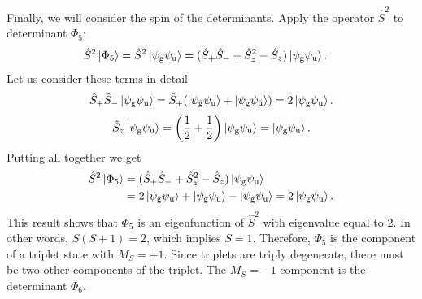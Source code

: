 \documentclass[../Main/chem532-notes.tex]{subfiles}
\begin{document}
Finally, we will consider the spin of the determinants.
Apply the operator $\hat{S}^2$ to determinant $\Phi_5$:
\begin{equation}
\begin{split}
\hat{S}^2 \ket{\Phi_5} &= \hat{S}^2  \ket{\psi_{\mathrm{g}} \psi_{\mathrm{u}}} 
= (\hat{S}_{+} \hat{S}_{-}  + \hat{S}_{z}^2 - \hat{S}_{z}) \ket{\psi_{\mathrm{g}} \psi_{\mathrm{u}}}.
\end{split}
\end{equation}
Let us consider these terms in detail
\begin{equation}
\hat{S}_{+} \hat{S}_{-} \ket{\psi_{\mathrm{g}} \psi_{\mathrm{u}}}
= \hat{S}_{+} (\ket{\psi_{\bar{\mathrm{g}}} \psi_{\mathrm{u}}} + \ket{\psi_{\mathrm{g}} \psi_{\bar{\mathrm{u}}}}
)
= 2 \ket{\psi_{\mathrm{g}} \psi_{\mathrm{u}}}.
\end{equation}
\begin{equation}
\hat{S}_{z} \ket{\psi_{\mathrm{g}} \psi_{\mathrm{u}}} = \left(\frac{1}{2} + \frac{1}{2}\right) \ket{\psi_{\mathrm{g}} \psi_{\mathrm{u}}} = \ket{\psi_{\mathrm{g}} \psi_{\mathrm{u}}}.
\end{equation}
Putting all together we get
\begin{equation}
\begin{split}
\hat{S}^2 \ket{\Phi_5} &= (\hat{S}_{+} \hat{S}_{-}  + \hat{S}_{z}^2 - \hat{S}_{z}) \ket{\psi_{\mathrm{g}} \psi_{\mathrm{u}}} \\
&= 2 \ket{\psi_{\mathrm{g}} \psi_{\mathrm{u}}} + \ket{\psi_{\mathrm{g}} \psi_{\mathrm{u}}} - \ket{\psi_{\mathrm{g}} \psi_{\mathrm{u}}} = 2 \ket{\psi_{\mathrm{g}} \psi_{\mathrm{u}}}.
\end{split}
\end{equation}
This result shows that $\Phi_5$ is an eigenfunction of $\hat{S}^2$ with eigenvalue equal to 2.
In other words, $S (S + 1) = 2$, which implies $S = 1$.
Therefore, $\Phi_5$ is the component of a triplet state with $M_S = +1$.
Since triplets are triply degenerate, there must be two other components of the triplet.
The $M_S = -1$ component is the determinant $\Phi_6$.
\end{document}
